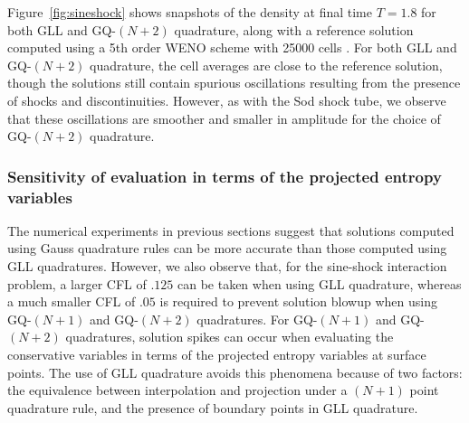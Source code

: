 \documentclass[preprint,10pt]{elsarticle}
\theoremstyle{definition}
\theoremstyle{lemma}
\theoremstyle{theorem}
\theoremstyle{assumption}
\newcommand{\note}[1]{{\color{blue}{#1}}}
\begin{document}
Figure~\ref{fig:sineshock} shows snapshots of the density at final time $T= 1.8$ for both GLL and GQ-$(N+2)$ quadrature, along with a reference solution computed using a 5th order WENO scheme with 25000 cells \cite{shu2009high}.  For both GLL and GQ-$(N+2)$ quadrature, the cell averages are close to the reference solution, though the solutions still contain spurious oscillations resulting from the presence of shocks and discontinuities.  However, as with the Sod shock tube, we observe that these oscillations are smoother and smaller in amplitude for the choice of GQ-$(N+2)$ quadrature.  


\subsubsection{Sensitivity of evaluation in terms of the projected entropy variables}
\label{sec:instab}

The numerical experiments in previous sections suggest that solutions computed using Gauss quadrature rules can be more accurate than those computed using GLL quadratures.  However, we also observe that, for the sine-shock interaction problem, a larger CFL of $.125$ can be taken when using GLL quadrature, whereas a much smaller CFL of $.05$ is required to prevent solution blowup when using GQ-$(N+1)$ and GQ-$(N+2)$ quadratures.  %
For GQ-$(N+1)$ and GQ-$(N+2)$ quadratures, solution spikes can occur when evaluating the conservative variables in terms of the projected entropy variables at surface points.  The use of GLL quadrature avoids this phenomena because of two factors: the equivalence between interpolation and projection under a $(N+1)$ point quadrature rule, and the presence of boundary points in GLL quadrature.  
\end{document}
